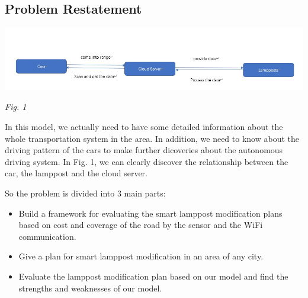 \documentclass[12pt]{article}
\theoremstyle{definition}
\theoremstyle{remark}
\numberwithin{equation}{section}
\begin{document}
		\subsection{Problem Restatement}
		\begin{center}
			\includegraphics[width=14cm]{diagram.jpg}
			
			\small \textit{Fig. 1}
			
		\end{center}
		In this model, we actually need to have some detailed information about the whole transportation system in the area. In addition, we need to know about the driving pattern of the cars to make further dicoveries about the autonomous driving system. In Fig. 1, we can clearly discover the relationship between the car, the lamppost and the cloud server.
		
		So the problem is divided into 3 main parts:
		\begin{itemize}
			\item Build a framework for evaluating the smart lamppost modification plans based on cost and coverage of the road by the sensor and the WiFi communication.
			\item Give a plan for smart lamppost modification in an area of any city.
			\item Evaluate the lamppost modification plan based on our model and find the strengths and weaknesses of our model.
		\end{itemize}
\end{document}

